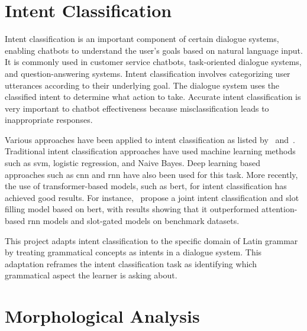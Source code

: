 \section{Intent Classification}
\label{sec:intent_classification}


Intent classification is an important component of 
certain dialogue systems, enabling chatbots to 
understand the user's goals based on natural language input. 
It is commonly used in customer service chatbots, 
task-oriented dialogue systems, and question-answering 
systems. Intent classification involves categorizing 
user utterances according to their underlying goal. 
The dialogue system uses the classified intent to determine 
what action to take. Accurate intent classification is 
very important to chatbot effectiveness because 
misclassification leads to inappropriate responses.

Various approaches have been applied to intent classification 
as listed by~\cite{hoque2025intent} and~\cite{10.1145/3718491.3718520}. 
Traditional intent classification approaches have used 
machine learning methods such as \gls{svm}, 
logistic regression, and Naive Bayes. 
Deep learning based approaches such as \gls{cnn}
and \gls{rnn} have also been used for this task. 
More recently, the use of transformer-based models, 
such as \gls{bert}, for intent classification has achieved good 
results. For instance,~\cite{chen2019bertjointintentclassification} 
propose a joint intent classification and slot filling model 
based on \gls{bert}, with results showing that it outperformed 
attention-based \gls{rnn} models and slot-gated models on benchmark 
datasets.

This project adapts intent classification to the specific 
domain of Latin grammar by treating grammatical concepts as 
intents in a dialogue system. This adaptation reframes the 
intent classification task as identifying which grammatical 
aspect the learner is asking about.

\section{Morphological Analysis}
\label{sec:morphological_analysis}




